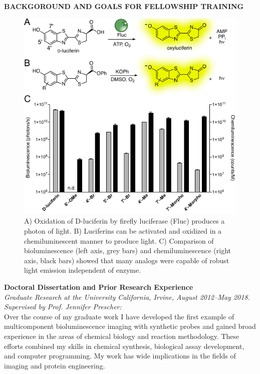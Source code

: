 \documentclass[11pt]{article}
\title{ }
\begin{document}
\begin{centering}
  \textbf{BACKGOROUND AND GOALS FOR FELLOWSHIP TRAINING}\\
\end{centering}
\begin{figure}
\begin{centering}
\includegraphics[width=\textwidth]{figures/chemilum.pdf}

\end{centering}
\footnotesize
\caption{\label{figure:chemilum}
A) Oxidation of D-luciferin by firefly luciferase (Fluc) produces a photon of light. B) Luciferins can be activated and oxidized in a chemiluminescent manner to produce light. C) Comparison of bioluminescence (left axis, grey bars) and chemiluminescence (right axis, black bars) showed that many analogs were capable of robust light emission independent of enzyme.}
\end{figure}
\textbf{Doctoral Dissertation and Prior Research Experience}\\ \textit{Graduate Research at the University California, Irvine, August 2012--May 2018. Supervised by Prof. Jennifer Prescher:}\\
Over the course of my graduate work I have developed the first example of multicomponent bioluminescence imaging with synthetic probes and gained broad experience in the areas of chemical biology and reaction methodology. These efforts combined my skills in chemical synthesis, biological assay development, and computer programming. My work has wide implications in the fields of imaging and protein engineering.
\end{document}
